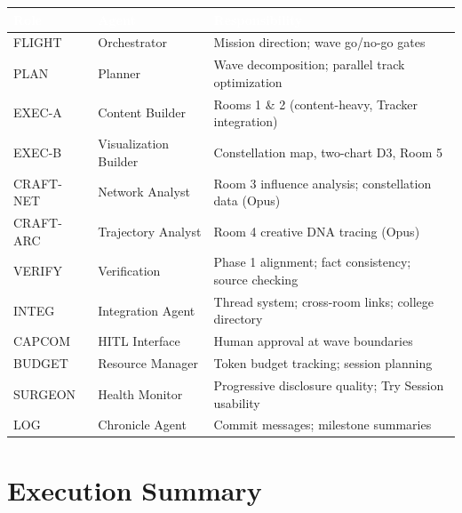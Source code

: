 \documentclass[11pt,letterpaper]{article}
\newcommand{\tableheader}[1]{\textbf{\sffamily\textcolor{white}{#1}}}
\begin{document}
\begin{center}
\begin{tabularx}{\textwidth}{L{2cm}L{3cm}X}
\toprule
{}
\tableheader{Role} & \tableheader{Agent} & \tableheader{Responsibility} \\
\midrule
FLIGHT & Orchestrator & Mission direction; wave go/no-go gates \\
PLAN & Planner & Wave decomposition; parallel track optimization \\
EXEC-A & Content Builder & Rooms 1 \& 2 (content-heavy, Tracker integration) \\
EXEC-B & Visualization Builder & Constellation map, two-chart D3, Room 5 \\
CRAFT-NET & Network Analyst & Room 3 influence analysis; constellation data (Opus) \\
CRAFT-ARC & Trajectory Analyst & Room 4 creative DNA tracing (Opus) \\
VERIFY & Verification & Phase 1 alignment; fact consistency; source checking \\
INTEG & Integration Agent & Thread system; cross-room links; college directory \\
CAPCOM & HITL Interface & Human approval at wave boundaries \\
BUDGET & Resource Manager & Token budget tracking; session planning \\
SURGEON & Health Monitor & Progressive disclosure quality; Try Session usability \\
LOG & Chronicle Agent & Commit messages; milestone summaries \\
\bottomrule
\end{tabularx}
\end{center}

\section{Execution Summary}
\end{document}
